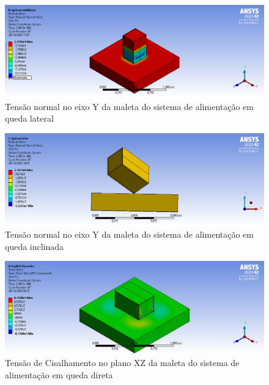 \begin{apendicesenv}
\begin{figure}[htb]
    \centering
    \includegraphics[width=1.0\textwidth, angle=0]{figuras/estrutura_simulacaoImpacto/ignicaoNormalYLadoMenor.png}
    \caption{Tensão normal no eixo Y da maleta do sistema de alimentação em queda lateral}
    \label{fig:simulacaoImpacto_02}
\end{figure}

\begin{figure}[htb]
    \centering
    \includegraphics[width=1.0\textwidth, angle=0]{figuras/estrutura_simulacaoImpacto/ignicaoNormalYCanto.png}
    \caption{Tensão normal no eixo Y da maleta do sistema de alimentação em queda inclinada}
    \label{fig:simulacaoImpacto_03}
\end{figure}


\begin{figure}[htb]
    \centering
    \includegraphics[width=1.0\textwidth, angle=0]{figuras/estrutura_simulacaoImpacto/ignicaoCisalhamentoXZLadoMaior.png}
    \caption{Tensão de Cisalhamento no plano XZ da maleta do sistema de alimentação em queda direta}
    \label{fig:simulacaoImpacto_04}
\end{figure}


\end{apendicesenv}
